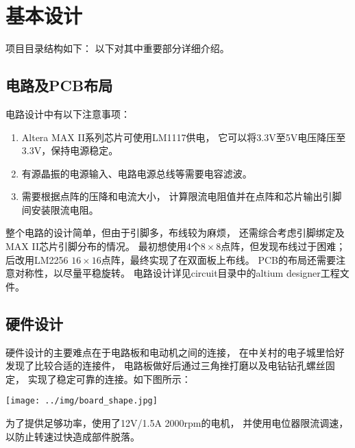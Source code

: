 
\section{基本设计}
项目目录结构如下：
以下对其中重要部分详细介绍。

\subsection{电路及PCB布局}
电路设计中有以下注意事项：
\begin{enumerate}
	\item Altera MAX II系列芯片可使用LM1117供电，
		它可以将3.3V至5V电压降压至3.3V，保持电源稳定。
	\item 有源晶振的电源输入、电路电源总线等需要电容滤波。
	\item 需要根据点阵的压降和电流大小，
		计算限流电阻值并在点阵和芯片输出引脚间安装限流电阻。
\end{enumerate}
整个电路的设计简单，但由于引脚多，布线较为麻烦，
还需综合考虑引脚绑定及MAX II芯片引脚分布的情况。
最初想使用4个$8\times 8$点阵，但发现布线过于困难；
后改用LM2256 $16\times 16$点阵，最终实现了在双面板上布线。
PCB的布局还需要注意对称性，以尽量平稳旋转。
电路设计详见circuit目录中的altium designer工程文件。

\subsection{硬件设计}
硬件设计的主要难点在于电路板和电动机之间的连接，
在中关村的电子城里恰好发现了比较合适的连接件，
电路板做好后通过三角挫打磨以及电钻钻孔螺丝固定，
实现了稳定可靠的连接。如下图所示：
\begin{center}
	\texttt{[image: ../img/board\_shape.jpg]}
\end{center}

为了提供足够功率，使用了12V/1.5A 2000rpm的电机，
并使用电位器限流调速，以防止转速过快造成部件脱落。

